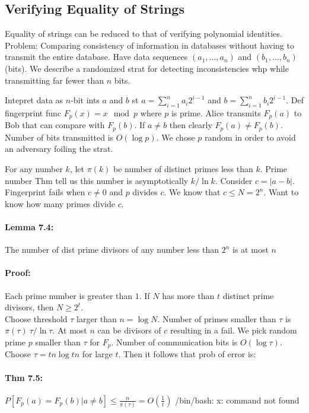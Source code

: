 \documentclass[a4paper]{article}
\begin{document}
\subsection{Verifying Equality of Strings}
\label{sub:Verifying Equality of Strings}
Equality of strings can be reduced to that of verifying polynomial identities.\\
Problem: Comparing consistency of information in databases without having to transmit the entire database. Have data sequences $(a_1,\ldots,a_n)$ and $(b_1,\ldots,b_n)$ (bits). We describe a randomized strat for detecting inconsistencies whp while transmitting far fewer than $n$ bits.

Intepret data as $n$-bit ints $a$ and $b$ st $a=\sum^{n}_{i=1} a_i2^{i-1}$ and $b=\sum^{n}_{i=1} b_i2^{i-1}$. Def fingerprint func $F_p(x)=x \mod p$ where $p$ is prime. Alice transmits $F_p(a)$ to Bob that can compare with $F_p(b)$. If $a\not = b$ then clearly $F_p(a)\not =F_p(b)$. Number of bits transmitted is $O(\log p)$. We chose $p$ random in order to avoid an adversary foiling the strat.

For any number $k$, let $\pi(k)$ be number of distinct primes less than $k$. Prime number Thm tell us this number is asymptotically $k/\ln k$. Consider $c=|a-b|$. Fingerprint fails when $c\not = 0$ and $p$ divides $c$. We know that $c\leq N=2^n$. Want to know how many primes divide $c$.
\paragraph{Lemma 7.4:} The number of dist prime divisors of any number less than $2^n$ is at most $n$
\paragraph{Proof:} Each prime number is greater than $1$. If $N$ has more than $t$ distinct prime divisors, then $N\geq 2^t$.\\

Choose threshold $\tau$ larger than $n=\log N$. Number of primes smaller than $\tau$ is $\pi(\tau)~ \tau/\ln \tau$. At most $n$ can be divisors of $c$ resulting in a fail. We pick random prime $p$ smaller than $\tau$ for $F_p$. Number of communication bits is $O(\log \tau)$. Choose $\tau=tn\log tn$ for large $t$. Then it follows that prob of error is:
\paragraph{Thm 7.5:} $P[F_p(a)=F_p(b)|a\not = b]\leq \frac{n}{\pi(\tau)}=O\left( \frac{1}{t} \right)$
/bin/bash: x: command not found
\end{document}
